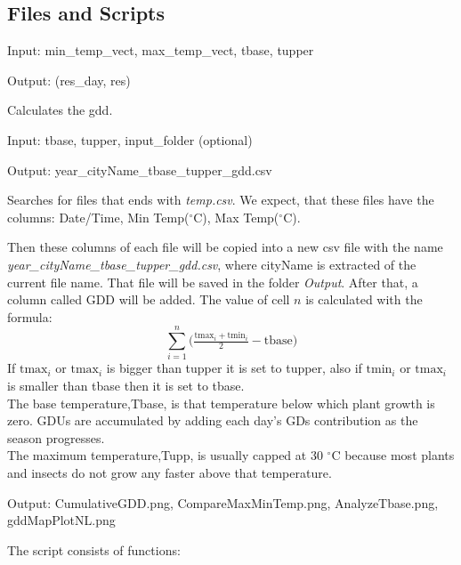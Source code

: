 \documentclass[12pt]{article}
\begin{document}
\subsection{Files and Scripts}
\begin{description}
\item[calc\_gdd.py]
\item Input: min\_temp\_vect, max\_temp\_vect, tbase, tupper
\item Output: (res\_day, res)
\item Calculates the gdd. %


\item[gdd.py]
\item Input: tbase, tupper, input\_folder (optional)
\item Output: year\_cityName\_tbase\_tupper\_gdd.csv
\item Searches for files that ends with \emph{temp.csv}. We expect, that these
files have the columns: Date/Time, Min Temp(${}^\circ$C), Max Temp(${}^\circ$C).

Then these columns of each file will be copied into a new csv file with the name
\emph{year\_cityName\_tbase\_tupper\_gdd.csv}, where cityName is extracted of the
current file name. That file will be saved in the folder \emph{Output}.
After that, a column called GDD will be added. 
The value of
cell $n$ is calculated with the formula:
$$
\sum_{i=1}^n \big( \tfrac{\text{tmax}_i+\text{tmin}_i}{2}-\text{tbase}\big)
$$
If $\text{tmax}_i$ or $\text{tmax}_i$ is bigger than tupper it is set to tupper,
 also if $\text{tmin}_i$ or $\text{tmax}_i$ 
is  smaller than tbase then it is set to tbase.
\\The base temperature,Tbase, is that temperature below which plant growth is zero.
 GDUs are accumulated by adding each day's GDs contribution as the season progresses.
\\ The maximum temperature,Tupp, is usually capped at 30 ${}^\circ$C because most plants and 
insects do not grow any faster above that temperature.

\item[bokeh\_serve\_gdd.py]

\item[create\_plots.py]
\item Output: CumulativeGDD.png, CompareMaxMinTemp.png, AnalyzeTbase.png, gddMapPlotNL.png
\item The script consists of functions:


\end{description}
\end{document}
